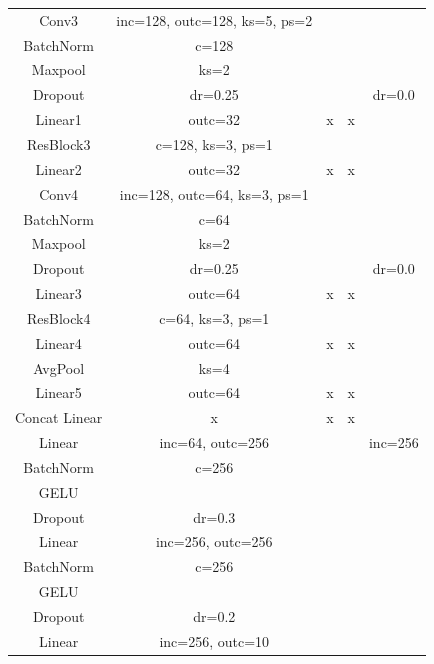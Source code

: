 \documentclass[a4 paper,12pt]{article}
\theoremstyle{definitionstyle}
\begin{document}
\begin{longtable}{|c|c|c|c|c|}
    \hline
    Conv3 & inc=128, outc=128, ks=5, ps=2 & & & \\
    BatchNorm & c=128 & & & \\
    Maxpool & ks=2 & & & \\
    Dropout & dr=0.25 & & & dr=0.0\\
    Linear1 & outc=32 & x & x & \\
    \hline
    ResBlock3 & c=128, ks=3, ps=1 & & & \\
    Linear2 & outc=32 & x & x & \\
    \hline
    Conv4 & inc=128, outc=64, ks=3, ps=1 & & & \\
    BatchNorm & c=64 & & & \\
    Maxpool & ks=2 & & & \\
    Dropout & dr=0.25 & & & dr=0.0\\
    Linear3 & outc=64 & x & x & \\
    \hline
    ResBlock4 & c=64, ks=3, ps=1 & & & \\
    Linear4 & outc=64 & x & x & \\
    \hline
    AvgPool & ks=4 & & & \\
    Linear5 & outc=64 & x & x & \\
    \hline
    Concat Linear & x & x & x & \\
    \hline
    Linear & inc=64, outc=256 & & & inc=256 \\
    BatchNorm & c=256 & & & \\
    GELU & & & & \\
    Dropout & dr=0.3 & & & \\
    Linear & inc=256, outc=256 & & & \\
    BatchNorm & c=256 & & & \\
    GELU & & & & \\
    Dropout & dr=0.2 & & & \\
    Linear & inc=256, outc=10 & & & \\      
    \hline
\end{longtable}
\end{document}
